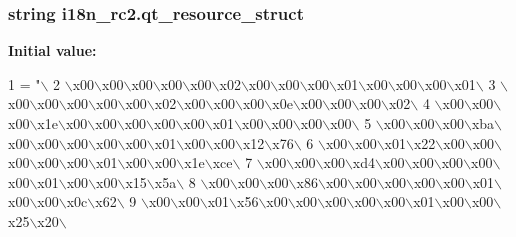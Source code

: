 \subsubsection[{qt\+\_\+resource\+\_\+struct}]{\setlength{\rightskip}{0pt plus 5cm}string i18n\+\_\+rc2.\+qt\+\_\+resource\+\_\+struct}\label{namespacei18n__rc2_a519d56d073bce5c3d315aa7d14ea3bd6}
{\bfseries Initial value\+:}
\begin{DoxyCode}
1 = \textcolor{stringliteral}{"\(\backslash\)}
2 \textcolor{stringliteral}{\(\backslash\)x00\(\backslash\)x00\(\backslash\)x00\(\backslash\)x00\(\backslash\)x00\(\backslash\)x02\(\backslash\)x00\(\backslash\)x00\(\backslash\)x00\(\backslash\)x01\(\backslash\)x00\(\backslash\)x00\(\backslash\)x00\(\backslash\)x01\(\backslash\)}
3 \textcolor{stringliteral}{\(\backslash\)x00\(\backslash\)x00\(\backslash\)x00\(\backslash\)x00\(\backslash\)x00\(\backslash\)x02\(\backslash\)x00\(\backslash\)x00\(\backslash\)x00\(\backslash\)x0e\(\backslash\)x00\(\backslash\)x00\(\backslash\)x00\(\backslash\)x02\(\backslash\)}
4 \textcolor{stringliteral}{\(\backslash\)x00\(\backslash\)x00\(\backslash\)x00\(\backslash\)x1e\(\backslash\)x00\(\backslash\)x00\(\backslash\)x00\(\backslash\)x00\(\backslash\)x00\(\backslash\)x01\(\backslash\)x00\(\backslash\)x00\(\backslash\)x00\(\backslash\)x00\(\backslash\)}
5 \textcolor{stringliteral}{\(\backslash\)x00\(\backslash\)x00\(\backslash\)x00\(\backslash\)xba\(\backslash\)x00\(\backslash\)x00\(\backslash\)x00\(\backslash\)x00\(\backslash\)x00\(\backslash\)x01\(\backslash\)x00\(\backslash\)x00\(\backslash\)x12\(\backslash\)x76\(\backslash\)}
6 \textcolor{stringliteral}{\(\backslash\)x00\(\backslash\)x00\(\backslash\)x01\(\backslash\)x22\(\backslash\)x00\(\backslash\)x00\(\backslash\)x00\(\backslash\)x00\(\backslash\)x00\(\backslash\)x01\(\backslash\)x00\(\backslash\)x00\(\backslash\)x1e\(\backslash\)xce\(\backslash\)}
7 \textcolor{stringliteral}{\(\backslash\)x00\(\backslash\)x00\(\backslash\)x00\(\backslash\)xd4\(\backslash\)x00\(\backslash\)x00\(\backslash\)x00\(\backslash\)x00\(\backslash\)x00\(\backslash\)x01\(\backslash\)x00\(\backslash\)x00\(\backslash\)x15\(\backslash\)x5a\(\backslash\)}
8 \textcolor{stringliteral}{\(\backslash\)x00\(\backslash\)x00\(\backslash\)x00\(\backslash\)x86\(\backslash\)x00\(\backslash\)x00\(\backslash\)x00\(\backslash\)x00\(\backslash\)x00\(\backslash\)x01\(\backslash\)x00\(\backslash\)x00\(\backslash\)x0c\(\backslash\)x62\(\backslash\)}
9 \textcolor{stringliteral}{\(\backslash\)x00\(\backslash\)x00\(\backslash\)x01\(\backslash\)x56\(\backslash\)x00\(\backslash\)x00\(\backslash\)x00\(\backslash\)x00\(\backslash\)x00\(\backslash\)x01\(\backslash\)x00\(\backslash\)x00\(\backslash\)x25\(\backslash\)x20\(\backslash\)}

\end{DoxyCode}
